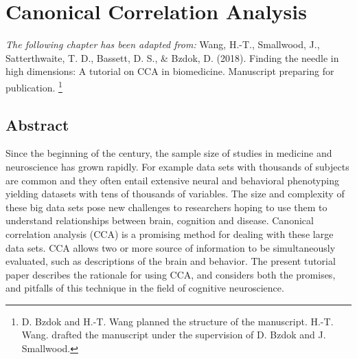 \chapter{Canonical Correlation Analysis}
\label{ch:methods}


\textit{The following chapter has been adapted from:}
Wang, H.-T., Smallwood, J., Satterthwaite, T. D., Bassett, D. S., \& Bzdok, D. (2018). Finding the needle in high dimensions: A tutorial on CCA in biomedicine. Manuscript preparing for publication.
\footnote{D. Bzdok and H.-T. Wang planned the structure of the manuscript.  H.-T. Wang. drafted the manuscript under the supervision of D. Bzdok and J. Smallwood.}
\section{Abstract}

Since the beginning of the  century, the sample size of studies in medicine and neuroscience has grown rapidly. For example data sets with thousands of subjects are common and they often entail extensive neural and behavioral phenotyping yielding datasets with tens of thousands of variables. The size and complexity of these big data sets pose new challenges to researchers hoping to use them to understand relationships between brain, cognition and disease. Canonical correlation analysis (CCA) is a promising method for dealing with these large data sets. CCA allows two or more source of information to be simultaneously evaluated, such as descriptions of the brain and behavior. The present tutorial paper describes the rationale for using CCA, and considers both the promises, and pitfalls of this technique in the field of cognitive neuroscience.


